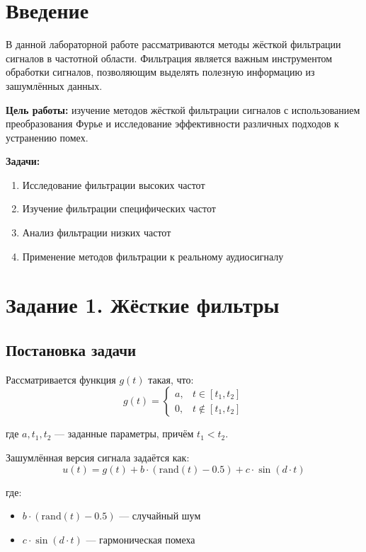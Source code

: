 \section*{Введение}

В данной лабораторной работе рассматриваются методы жёсткой фильтрации сигналов в частотной области. Фильтрация является важным инструментом обработки сигналов, позволяющим выделять полезную информацию из зашумлённых данных.

\textbf{Цель работы:} изучение методов жёсткой фильтрации сигналов с использованием преобразования Фурье и исследование эффективности различных подходов к устранению помех.

\textbf{Задачи:}
\begin{enumerate}
    \item Исследование фильтрации высоких частот
    \item Изучение фильтрации специфических частот
    \item Анализ фильтрации низких частот
    \item Применение методов фильтрации к реальному аудиосигналу
\end{enumerate}

\section*{Задание 1. Жёсткие фильтры}

\subsection*{Постановка задачи}

Рассматривается функция $g(t)$ такая, что:
\begin{equation}
g(t) = \begin{cases}
a, & t \in [t_1, t_2] \\
0, & t \notin [t_1, t_2]
\end{cases}
\end{equation}

где $a, t_1, t_2$ — заданные параметры, причём $t_1 < t_2$.

Зашумлённая версия сигнала задаётся как:
\begin{equation}
u(t) = g(t) + b \cdot (\text{rand}(t) - 0.5) + c \cdot \sin(d \cdot t)
\end{equation}

где:
\begin{itemize}
    \item $b \cdot (\text{rand}(t) - 0.5)$ — случайный шум
    \item $c \cdot \sin(d \cdot t)$ — гармоническая помеха
\end{itemize}

